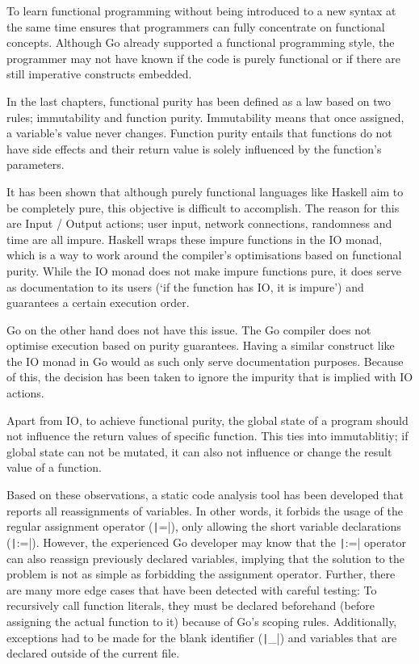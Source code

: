 
To learn functional programming without being introduced to a new syntax at the same time
ensures that programmers can fully concentrate on functional concepts. Although Go already
supported a functional programming style, the programmer may not have known if the code is
purely functional or if there are still imperative constructs embedded.

In the last chapters, functional purity has been defined as a law based on two rules; immutability
and function purity. Immutability means that once assigned, a variable's value never
changes. Function purity entails that functions do not have side effects and their return
value is solely influenced by the function's parameters.

It has been shown that although purely functional languages like Haskell aim to be completely
pure, this objective is difficult to accomplish. The reason for this are Input / Output actions; user
input, network connections, randomness and time are all impure. Haskell wraps
these impure functions in the IO monad, which is a way to work around the compiler's optimisations
based on functional purity. While the IO monad does not make impure functions pure, it
does serve as documentation to its users (`if the function has IO, it is impure') and
guarantees a certain execution order.

Go on the other hand does not have this issue. The Go compiler does not optimise execution
based on purity guarantees. Having a similar construct like the IO monad in Go would as such
only serve documentation purposes. Because of this, the decision has been taken to ignore
the impurity that is implied with IO actions.

Apart from IO, to achieve functional purity, the global state of a program should not influence
the return values of specific function. This ties into immutablitiy; if global state can
not be mutated, it can also not influence or change the result value of a function.

Based on these observations, a static code analysis tool has been developed that reports
all reassignments of variables. In other words, it forbids the usage of the regular
assignment operator (\texttt|=|), only allowing the short variable declarations
(\texttt|:=|). However, the experienced Go developer may know that the \texttt|:=|
operator can also reassign previously declared variables, implying that the solution to the
problem is not as simple as forbidding the assignment operator.
Further, there are many more edge cases that have been detected with careful testing:
To recursively call function literals, they must be declared beforehand (before assigning
the actual function to it) because of Go's scoping rules. Additionally, exceptions
had to be made for the blank identifier (\texttt|_|) and variables that are declared
outside of the current file.

